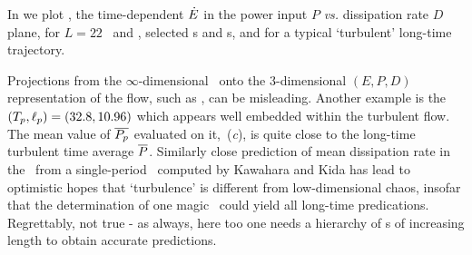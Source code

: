 In  we plot , the time-dependent
$\dot{E}$ in the power input $P$ {\em vs.}
dissipation rate $D$
plane, for $L=22$ \eqva\ and \reqva,
selected \po s and \rpo s, and for a typical `turbulent' long-time
trajectory.

Projections from the $\infty$-dimensional \statesp\ onto the 3-dimensional
$(E,P,D)$ representation of the flow, such as
, can be misleading. Another example is
the \rpo\ $({T_{p}},\ell_p) =(32.8,10.96)$ which appears well embedded
within the turbulent flow. The mean value of $\overline{P_p}$ evaluated on
it, \,(\textit{c}), is quite close to the long-time
turbulent time average $\overline{P}$.
Similarly close prediction of mean dissipation rate in the
\pCf\ from a single-period \po\ computed by
Kawahara and Kida has lead to
optimistic hopes that `turbulence' is different from
low-dimensional chaos, insofar that the determination of one
magic \po\ could yield all long-time predications.
Regrettably, not true - as always, here too one needs a hierarchy
of \po s of increasing length to obtain accurate
predictions.

